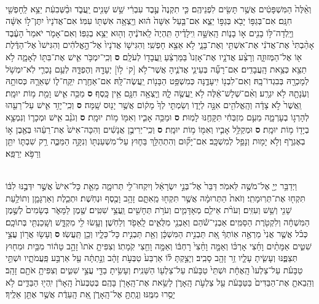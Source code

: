 \documentclass[twoside, openany, parskip=half, 11pt]{book}
\begin{document}
\begin{footnotesize}
\begin{multicols}{2}
\\
 וְאֵ֨לֶּה֙ הַמִּשְׁפָּטִ֔ים אֲשֶׁ֥ר תָּשִׂ֖ים לִפְנֵיהֶֽם׃ כִּ֤י תִקְנֶה֙ עֶ֣בֶד עִבְרִ֔י שֵׁ֥שׁ שָׁנִ֖ים יַֽעֲבֹ֑ד וּבַ֨שְּׁבִעִ֔ת יֵצֵ֥א לַֽחָפְשִׁ֖י חִנָּֽם׃ אִם־בְּגַפּ֥וֹ יָבֹ֖א בְּגַפּ֣וֹ יֵצֵ֑א אִם־בַּ֤עַל אִשָּׁה֙ ה֔וּא וְיָֽצְאָ֥ה אִשְׁתּ֖וֹ עִמּֽוֹ׃ אִם־אֲדֹנָיו֙ יִתֶּן־ל֣וֹ אִשָּׁ֔ה וְיָֽלְדָה־לּ֥וֹ בָנִ֖ים א֣וֹ בָנ֑וֹת הָֽאִשָּׁ֣ה וִֽילָדֶ֗יהָ תִּֽהְיֶה֙ לַֽאדֹנֶ֔יהָ וְה֖וּא יֵצֵ֥א בְגַפּֽוֹ׃ וְאִם־אָמֹ֤ר יֹאמַר֙ הָעֶ֔בֶד אָהַ֨בְתִּי֙ אֶת־אֲדֹנִ֔י אֶת־אִשְׁתִּ֖י וְאֶת־בָּנָ֑י לֹ֥א אֵצֵ֖א חָפְשִֽׁי׃ וְהִגִּישׁ֤וֹ אֲדֹנָיו֙ אֶל־הָ֣אֱלֹהִ֔ים וְהִגִּישׁוֹ֙ אֶל־הַדֶּ֔לֶת א֖וֹ אֶל־הַמְּזוּזָ֑ה וְרָצַ֨ע אֲדֹנָ֤יו אֶת־אָזְנוֹ֙ בַּמַּרְצֵ֔עַ וַֽעֲבָד֖וֹ לְעֹלָֽם׃ \textbf{ס}  וְכִֽי־יִמְכֹּ֥ר אִ֛ישׁ אֶת־בִּתּ֖וֹ לְאָמָ֑ה לֹ֥א תֵצֵ֖א כְּצֵ֥את הָֽעֲבָדִֽים׃ אִם־רָעָ֞ה בְּעֵינֵ֧י אֲדֹנֶ֛יהָ אֲשֶׁר־לֹ֥א [ק‘ ל֥וֹ] יְעָדָ֖הּ וְהֶפְדָּ֑הּ לְעַ֥ם נָכְרִ֛י לֹֽא־יִמְשֹׁ֥ל לְמָכְרָ֖הּ בְּבִגְדוֹ־בָֽהּ׃ וְאִם־לִבְנ֖וֹ יִֽיעָדֶ֑נָּה כְּמִשְׁפַּ֥ט הַבָּנ֖וֹת יַֽעֲשֶׂה־לָּֽהּ׃ אִם־אַחֶ֖רֶת יִֽקַּֽח־ל֑וֹ שְׁאֵרָ֛הּ כְּסוּתָ֥הּ וְעֹֽנָתָ֖הּ לֹ֥א יִגְרָֽע׃ וְאִ֨ם־שְׁלָשׁ־אֵ֔לֶּה לֹ֥א יַֽעֲשֶׂ֖ה לָ֑הּ וְיָֽצְאָ֥ה חִנָּ֖ם אֵ֥ין כָּֽסֶף׃ \textbf{ס}  מַכֵּ֥ה אִ֛ישׁ וָמֵ֖ת מ֥וֹת יוּמָֽת׃ וַֽאֲשֶׁר֙ לֹ֣א צָדָ֔ה וְהָֽאֱלֹהִ֖ים אִנָּ֣ה לְיָד֑וֹ וְשַׂמְתִּ֤י לְךָ֙ מָק֔וֹם אֲשֶׁ֥ר יָנ֖וּס שָֽׁמָּה׃ \textbf{ס} וְכִֽי־יָזִ֥ד אִ֛ישׁ עַל־רֵעֵ֖הוּ לְהָרְג֣וֹ בְעָרְמָ֑ה מֵעִ֣ם מִזְבְּחִ֔י תִּקָּחֶ֖נּוּ לָמֽוּת׃ \textbf{ס} וּמַכֵּ֥ה אָבִ֛יו וְאִמּ֖וֹ מ֥וֹת יוּמָֽת׃ \textbf{ס} וְגֹנֵ֨ב אִ֧ישׁ וּמְכָר֛וֹ וְנִמְצָ֥א בְיָד֖וֹ מ֥וֹת יוּמָֽת׃ \textbf{ס} וּמְקַלֵּ֥ל אָבִ֛יו וְאִמּ֖וֹ מ֥וֹת יוּמָֽת׃ \textbf{ס} וְכִֽי־יְרִיבֻ֣ן אֲנָשִׁ֔ים וְהִכָּה־אִישׁ֙ אֶת־רֵעֵ֔הוּ בְּאֶ֖בֶן א֣וֹ בְאֶגְרֹ֑ף וְלֹ֥א יָמ֖וּת וְנָפַ֥ל לְמִשְׁכָּֽב׃ אִם־יָק֞וּם וְהִתְהַלֵּ֥ךְ בַּח֛וּץ עַל־מִשְׁעַנְתּ֖וֹ וְנִקָּ֣ה הַמַּכֶּ֑ה רַ֥ק שִׁבְתּ֛וֹ יִתֵּ֖ן וְרַפֹּ֥א יְרַפֵּֽא׃

\\
 וַיְדַבֵּ֥ר יְיָ֖ אֶל־מֹשֶׁ֥ה לֵּאמֹֽר׃ דַּבֵּר֙ אֶל־בְּנֵ֣י יִשְׂרָאֵ֔ל וְיִקְחוּ־לִ֖י תְּרוּמָ֑ה מֵאֵ֤ת כָּל־אִישׁ֙ אֲשֶׁ֣ר יִדְּבֶ֣נּוּ לִבּ֔וֹ תִּקְח֖וּ אֶת־תְּרֽוּמָתִֽי׃ וְזֹאת֙ הַתְּרוּמָ֔ה אֲשֶׁ֥ר תִּקְח֖וּ מֵֽאִתָּ֑ם זָהָ֥ב וָכֶ֖סֶף וּנְחֹֽשֶׁת׃ וּתְכֵ֧לֶת וְאַרְגָּמָ֛ן וְתוֹלַ֥עַת שָׁנִ֖י וְשֵׁ֥שׁ וְעִזִּֽים׃ וְעֹרֹ֨ת אֵילִ֧ם מְאָדָּמִ֛ים וְעֹרֹ֥ת תְּחָשִׁ֖ים וַֽעֲצֵ֥י שִׁטִּֽים׃  שֶׁ֖מֶן לַמָּאֹ֑ר בְּשָׂמִים֙ לְשֶׁ֣מֶן הַמִּשְׁחָ֔ה וְלִקְטֹ֖רֶת הַסַּמִּֽים׃ אַבְנֵי־שֹׁ֕הַם וְאַבְנֵ֖י מִלֻּאִ֑ים לָֽאֵפֹ֖ד וְלַחֹֽשֶׁן׃ וְעָ֥שׂוּ לִ֖י מִקְדָּ֑שׁ וְשָֽׁכַנְתִּ֖י בְּתוֹכָֽם׃ כְּכֹ֗ל אֲשֶׁ֤ר אֲנִי֙ מַרְאֶ֣ה אֽוֹתְךָ֔ אֵ֚ת תַּבְנִ֣ית הַמִּשְׁכָּ֔ן וְאֵ֖ת תַּבְנִ֣ית כָּל־כֵּלָ֑יו וְכֵ֖ן תַּֽעֲשֽׂוּ׃ \textbf{ס}  וְעָשׂ֥וּ אֲר֖וֹן עֲצֵ֣י שִׁטִּ֑ים אַמָּתַ֨יִם וָחֵ֜צִי אָרְכּ֗וֹ וְאַמָּ֤ה וָחֵ֨צִי֙ רָחְבּ֔וֹ וְאַמָּ֥ה וָחֵ֖צִי קֹֽמָתֽוֹ׃ וְצִפִּיתָ֤ אֹתוֹ֙ זָהָ֣ב טָה֔וֹר מִבַּ֥יִת וּמִח֖וּץ תְּצַפֶּ֑נּוּ וְעָשִׂ֧יתָ עָלָ֛יו זֵ֥ר זָהָ֖ב סָבִֽיב׃ וְיָצַ֣קְתָּ לּ֗וֹ אַרְבַּע֙ טַבְּעֹ֣ת זָהָ֔ב וְנָ֣תַתָּ֔ה עַ֖ל אַרְבַּ֣ע פַּֽעֲמֹתָ֑יו וּשְׁתֵּ֣י טַבָּעֹ֗ת עַל־צַלְעוֹ֙ הָֽאֶחָ֔ת וּשְׁתֵּי֙ טַבָּעֹ֔ת עַל־צַלְע֖וֹ הַשֵּׁנִֽית׃ וְעָשִׂ֥יתָ בַדֵּ֖י עֲצֵ֣י שִׁטִּ֑ים וְצִפִּיתָ֥ אֹתָ֖ם זָהָֽב׃ וְהֵֽבֵאתָ֤ אֶת־הַבַּדִּים֙ בַּטַּבָּעֹ֔ת עַ֖ל צַלְעֹ֣ת הָֽאָרֹ֑ן לָשֵׂ֥את אֶת־הָֽאָרֹ֖ן בָּהֶֽם׃ בְּטַבְּעֹת֙ הָֽאָרֹ֔ן יִֽהְי֖וּ הַבַּדִּ֑ים לֹ֥א יָסֻ֖רוּ מִמֶּֽנּוּ׃ וְנָֽתַתָּ֖ אֶל־הָֽאָרֹ֑ן אֵ֚ת הָֽעֵדֻ֔ת אֲשֶׁ֥ר אֶתֵּ֖ן אֵלֶֽיךָ׃


\end{multicols}
\end{footnotesize}
\end{document}
